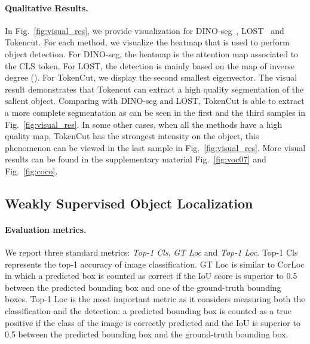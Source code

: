 \documentclass[twocolumn]{article}
\begin{document}
\paragraph{Qualitative Results.}
In Fig.~\ref{fig:visual_res}, we provide visualization for DINO-seg~\cite{caron2021emerging}, LOST~\cite{simeoni2021localizing} and Tokencut. For each method, we visualize the heatmap that is used to perform object detection. For DINO-seg, the heatmap is the attention map associated to the CLS token. For LOST, the detection is mainly based on the map of inverse degree (). For TokenCut, we display the second smallest eigenvector. The visual result demonstrates that Tokencut can extract a high quality segmentation of the salient object. Comparing with DINO-seg and LOST, TokenCut is able to extract a more complete segmentation as can be seen in the first and the third samples in Fig.~\ref{fig:visual_res}. In some other cases, when all the methods have a high quality map, TokenCut has the strongest intensity on the object, this phenomenon can be viewed in the last sample in Fig.~\ref{fig:visual_res}. More visual results can be found in the supplementary material Fig.~\ref{fig:voc07} and Fig.~\ref{fig:coco}.






 






\subsection{Weakly Supervised Object Localization}
\label{sec:WSOL}







\paragraph{Evaluation metrics.} 
We report three standard metrics: \textit{Top-1 Cls}, \textit{GT Loc} and \textit{Top-1 Loc}. Top-1 Cls represents the top-1 accuracy of image classification. GT Loc is similar to CorLoc in which a predicted box is counted as correct if the IoU score is superior to 0.5 between the predicted bounding box and one of the ground-truth bounding boxes. Top-1 Loc is the most important metric as it considers measuring both the classification and the detection: a predicted bounding box is counted as a true positive if the class of the image is correctly predicted and the IoU is superior to 0.5 between the predicted bounding box and the ground-truth bounding box.
 
\end{document}
